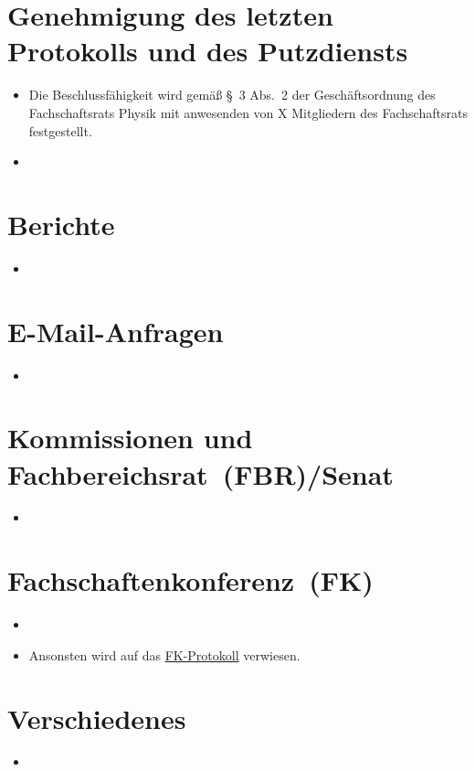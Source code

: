 \documentclass[sitzung=fsr,entwurf]{fsphys-protokoll}
\begin{document}
\section{Genehmigung des letzten Protokolls und des Putzdiensts}
\begin{itemize}
	\item Die Beschlussfähigkeit wird gemäß §~3 Abs.~2 der Geschäftsordnung des Fachschaftsrats Physik mit {\protokollanzahlanwesend} anwesenden von X Mitgliedern des Fachschaftsrats festgestellt.
	\item 
\end{itemize}

\section{Berichte}
\begin{itemize}
	\item 
\end{itemize}

\section{E-Mail-Anfragen}
\begin{itemize}
	\item 
\end{itemize}

\section{Kommissionen und Fachbereichsrat~(FBR)/Senat}
\begin{itemize}
	\item 
\end{itemize}

\section{Fachschaftenkonferenz~(FK)}
\begin{itemize}
	\item 
	\item Ansonsten wird auf das \href{https://www.asta.ms/fachschaftenportal#fkprotokolle}{FK-Protokoll} verwiesen.
\end{itemize}

\section{Verschiedenes}
\begin{itemize}
	\item 
\end{itemize}
\end{document}
